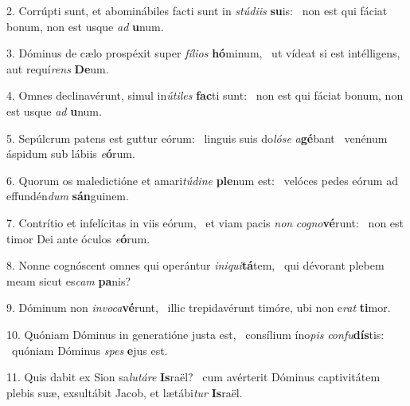 2. Corrúpti sunt, et abominábiles facti sunt in \textit{stú}\textit{di}\textit{is} \textbf{su}is: \ast\  non est qui fáciat bonum, non est usque \textit{ad} \textbf{u}num.\

3. Dóminus de cælo prospéxit super \textit{fí}\textit{li}\textit{os} \textbf{hó}minum, \ast\  ut vídeat si est intélligens, aut requí\textit{rens} \textbf{De}um.\

4. Omnes declinavérunt, simul in\textit{ú}\textit{ti}\textit{les} \textbf{fac}ti sunt: \ast\  non est qui fáciat bonum, non est usque \textit{ad} \textbf{u}num.\

5. Sepúlcrum patens est guttur eórum: \dag\  linguis suis do\textit{ló}\textit{se} \textit{a}\textbf{gé}bant \ast\  venénum áspidum sub lábiis \textit{e}\textbf{ó}rum.\

6. Quorum os maledictióne et amari\textit{tú}\textit{di}\textit{ne} \textbf{ple}num est: \ast\  velóces pedes eórum ad effundén\textit{dum} \textbf{sán}guinem.\

7. Contrítio et infelícitas in viis eórum, \dag\  et viam pacis \textit{non} \textit{co}\textit{gno}\textbf{vé}runt: \ast\  non est timor Dei ante óculos \textit{e}\textbf{ó}rum.\

8. Nonne cognóscent omnes qui operántur \textit{in}\textit{i}\textit{qui}\textbf{tá}tem, \ast\  qui dévorant plebem meam sicut es\textit{cam} \textbf{pa}nis?\

9. Dóminum non \textit{in}\textit{vo}\textit{ca}\textbf{vé}runt, \ast\  illic trepidavérunt timóre, ubi non e\textit{rat} \textbf{ti}mor.\

10. Quóniam Dóminus in generatióne justa est, \dag\  consílium íno\textit{pis} \textit{con}\textit{fu}\textbf{dís}tis: \ast\  quóniam Dóminus \textit{spes} \textbf{e}jus est.\

11. Quis dabit ex Sion sa\textit{lu}\textit{tá}\textit{re} \textbf{Is}raël? \ast\  cum avérterit Dóminus captivitátem plebis suæ, exsultábit Jacob, et lætábi\textit{tur} \textbf{Is}raël.\

